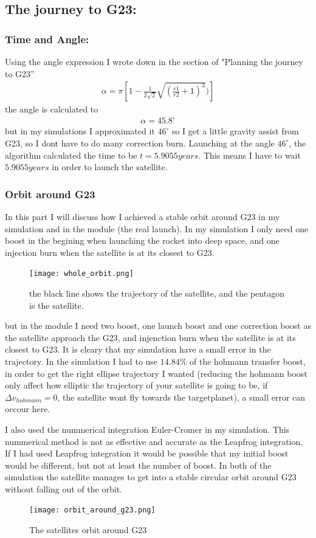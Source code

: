 \documentclass[a4paper,11pt,english]{report}
\begin{document}
\newpage
\subsection{The journey to G23:}
\subsubsection{Time and Angle:} Using the angle expression I wrote down in the
section of "Planning the journey to G23''
\begin{align}
  \alpha = \pi[1- \frac{1}{2\sqrt{2}}\sqrt{(\frac{r1}{r2} + 1)^{3}})]
\end{align}
the angle is calculated to
\begin{align}
  \alpha = 45.8^{\circ}
\end{align}
but in my simulations I approximated it \(46^{\circ}\) so I get a little
gravity assist from G23, so I dont have to do many correction burn. Launching
at the angle \(46^{\circ}\), the algorithm calculated the time to be \(t =
5.9055 years\). This means I have to wait \(5.9055 years\) in order to launch
the satellite. 
\subsubsection{Orbit around G23}
In this part I will discuss how I achieved a
stable orbit around G23 in my simulation and in the module (the real launch).
In my simulation I only need one boost in the begining when launching the
rocket into deep space, and one injection burn when the satellite is at its
closest to G23.
\begin{figure}[h]
  \centering
  \texttt{[image: whole\_orbit.png]}
  \caption{the black line shows the trajectory of the satellite, and the
    pentagon is the satellite.}
\end{figure}
\newpage
but in the module I need two boost, one launch boost and one correction boost as
the satellite approach the G23, and injenction burn when the satellite is at
its closest to G23. It is cleary that my simulation have a small error in the
trajectory. In the simulation I had to use \(14.84\%\) of the hohmann transfer
boost, in order to get the right ellipse trajectory I wanted (reducing the
hohmann boost only affect how elliptic the trajectory of your satellite is
going to be, if \(\Delta v_{hohmann} = 0\), the satellite wont fly towards the
targetplanet), a small error can occour here.

I also used the nummerical integration Euler-Cromer in my simulation. This
nummerical method is not as effective and accurate as the Leapfrog integration.
If I had used Leapfrog integration it would be possible that my initial boost
would be different, but not at least the number of boost.
In both of the simulation the satellite manages to get into a stable circular
orbit around G23 without falling out of the orbit.
\begin{figure}[h]
  \centering
  \texttt{[image: orbit\_around\_g23.png]}
  \caption{The satellites orbit around G23}
\end{figure}
\end{document}
